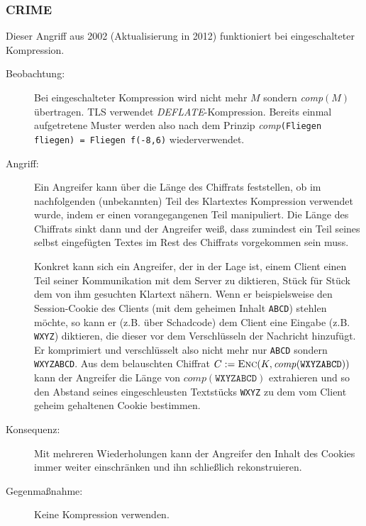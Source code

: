 \subsubsection{CRIME}
\label{sec:keyex:crime}
Dieser Angriff aus 2002 (Aktualisierung in 2012) funktioniert bei
eingeschalteter Kompression. 
\begin{description}
\item[Beobachtung:] Bei eingeschalteter Kompression wird nicht mehr $M$
  sondern \emph{comp}$(M)$ übertragen. TLS verwendet
  \emph{DEFLATE}-Kompression. Bereits einmal aufgetretene Muster werden
  also nach dem Prinzip \emph{comp}\texttt{(Fliegen fliegen) = Fliegen
    f(-8,6)} wiederverwendet.
\item[Angriff:] Ein Angreifer kann über die Länge des Chiffrats
  feststellen, ob im nachfolgenden (unbekannten) Teil des Klartextes
  Kompression verwendet wurde, indem er einen vorangegangenen Teil
  manipuliert. Die Länge des Chiffrats sinkt dann und der Angreifer weiß,
  dass zumindest ein Teil seines selbst eingefügten Textes im Rest des
  Chiffrats vorgekommen sein muss.
  
  Konkret kann sich ein Angreifer, der in der Lage ist, einem Client
  einen Teil seiner Kommunikation mit dem Server zu diktieren, Stück für
  Stück dem von ihm gesuchten Klartext nähern. Wenn er beispielsweise den
  Session-Cookie des Clients (mit dem geheimen Inhalt \texttt{ABCD})
  stehlen möchte, so kann er (z.B. über Schadcode) dem Client eine Eingabe
  (z.B. \texttt{WXYZ}) diktieren, die dieser vor dem Verschlüsseln der
  Nachricht hinzufügt. Er komprimiert und verschlüsselt also nicht mehr
  nur \texttt{ABCD} sondern \texttt{WXYZABCD}. Aus dem belauschten
  Chiffrat $C := \textsc{Enc}(K, \mathit{comp}(\mathtt{WXYZABCD}))$ kann der
  Angreifer die Länge von $\mathit{comp}(\mathtt{WXYZABCD})$ extrahieren
  und so den Abstand seines eingeschleusten Textstücks \texttt{WXYZ} zu
  dem vom Client geheim gehaltenen Cookie bestimmen.
\item[Konsequenz:] Mit mehreren Wiederholungen kann der Angreifer den
  Inhalt des Cookies immer weiter einschränken und ihn schließlich
  rekonstruieren.
\item[Gegenmaßnahme:] Keine Kompression verwenden.
\end{description}

